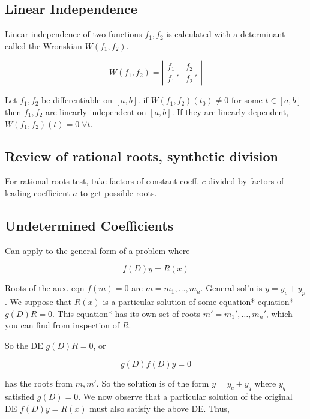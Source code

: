 \subsection{Linear Independence}

Linear independence of two functions $f_1,f_2$ is calculated with a determinant called the Wronskian $W(f_1,f_2)$.

\begin{equation*}
    W(f_1,f_2)=\left|\begin{matrix}f_1&f_2\\f_1\,'&f_2\,'\end{matrix}\right|
\end{equation*}

Let $f_1,f_2$ be differentiable on $[a,b]$. if $W(f_1,f_2)(t_0)\neq 0$ for some $t\in [a,b]$ then $f_1,f_2$ are linearly independent on $[a,b]$.
If they are linearly dependent, $W(f_1,f_2)(t)=0\;\forall t$.

\subsection{Review of rational roots, synthetic division}

For rational roots test, take factors of constant coeff. $c$ divided by factors of
leading coefficient $a$ to get possible roots.

\subsection{Undetermined Coefficients}

Can apply to the general form of a problem where

\begin{equation*}
    f(D)y=R(x)
\end{equation*}

Roots of the aux. eqn $f(m)=0$ are $m=m_1,\ldots,m_n$.
General sol'n is $y=y_c+y_p$. We suppose that $R(x)$ is a particular solution of some equation* equation* $g(D)R=0$.
This equation* has its own set of roots $m'=m_1',\ldots,m_n'$, which you can find from inspection of $R$.

So the DE $g(D)R=0$, or

\begin{equation*}
    g(D)f(D)y=0
\end{equation*}

has the roots from $m,m'$. So the solution is of the form $y=y_c+y_q$ where $y_q$ satisfied $g(D)=0$.
We now observe that a particular solution of the original DE $f(D)y=R(x)$ must also satisfy the above DE.
Thus,

